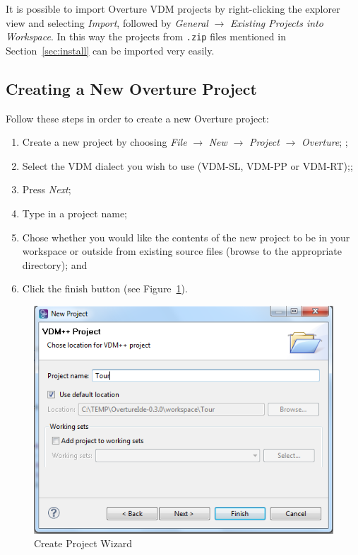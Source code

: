 \documentclass{overturerepsec}
\begin{document}
It is possible to import Overture VDM projects by
right-clicking the explorer view and selecting \emph{Import}, followed
by \emph{General} $\rightarrow$ \emph{Existing Projects into
  Workspace}.  In this way the projects from \texttt{.zip} files
mentioned in Section~\ref{sec:install} can be imported very
easily.  

\subsection{Creating a New Overture Project}

Follow these steps in order to create a new Overture project:

\begin{enumerate}
	\item Create a new project by choosing \emph{File}
          $\rightarrow$ \emph{New} $\rightarrow$ \emph{Project}
          $\rightarrow$ \emph{Overture}; ;
	\item Select the VDM dialect you wish to use (VDM-SL, VDM-PP
          or VDM-RT);;
	\item Press \emph{Next};
         \item Type in a project name;
	\item Chose whether you would like the contents of the new
          project to be in your workspace or outside from existing
          source files (browse to the appropriate directory); and
         \item Click
	the finish button (see Figure~\ref{fig:CreateProjectWizard}).
\end{enumerate}

\begin{figure}[!htb]
	\begin{center}
	  \includegraphics[scale=0.8]{figures/CreateProjectWizard}
	  \caption[Create Project Wizard]{Create Project Wizard}
	  \label{fig:CreateProjectWizard}
	\end{center}
\end{figure}
\end{document}
